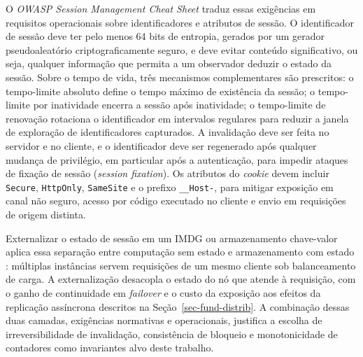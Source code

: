 O \emph{OWASP Session Management Cheat Sheet} \citep{owasp_session_mgmt_cheatsheet} traduz essas exigências em requisitos operacionais sobre identificadores e atributos de sessão. O identificador de sessão deve ter pelo menos 64 bits de entropia, gerados por um gerador pseudoaleatório criptograficamente seguro, e deve evitar conteúdo significativo, ou seja, qualquer informação que permita a um observador deduzir o estado da sessão. Sobre o tempo de vida, três mecanismos complementares são prescritos: o tempo-limite absoluto define o tempo máximo de existência da sessão; o tempo-limite por inatividade encerra a sessão após inatividade; o tempo-limite de renovação rotaciona o identificador em intervalos regulares para reduzir a janela de exploração de identificadores capturados. A invalidação deve ser feita no servidor e no cliente, e o identificador deve ser regenerado após qualquer mudança de privilégio, em particular após a autenticação, para impedir ataques de fixação de sessão (\emph{session fixation}). Os atributos do \emph{cookie} devem incluir \texttt{Secure}, \texttt{HttpOnly}, \texttt{SameSite} e o prefixo \texttt{\_\_Host-}, para mitigar exposição em canal não seguro, acesso por código executado no cliente e envio em requisições de origem distinta.

Externalizar o estado de sessão em um IMDG ou armazenamento chave-valor aplica essa separação entre computação sem estado e armazenamento com estado \citep{armbrust_cloud_2010}: múltiplas instâncias servem requisições de um mesmo cliente sob balanceamento de carga. A externalização desacopla o estado do nó que atende à requisição, com o ganho de continuidade em \emph{failover} e o custo da exposição aos efeitos da replicação assíncrona descritos na Seção~\ref{sec-fund-distrib}. A combinação dessas duas camadas, exigências normativas e operacionais, justifica a escolha de irreversibilidade de invalidação, consistência de bloqueio e monotonicidade de contadores como invariantes alvo deste trabalho.